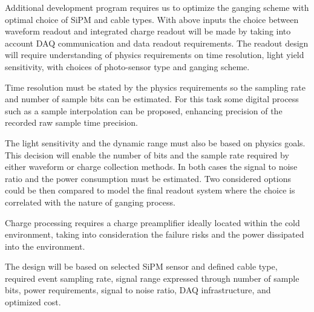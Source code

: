Additional development program requires us to optimize the ganging scheme with optimal choice of SiPM and cable types. With above inputs 
the choice between waveform readout and integrated charge readout will be made by taking into account DAQ communication and data 
readout requirements. The readout design will require understanding of physics requirements on time resolution, light yield 
sensitivity, with choices of photo-sensor type and ganging scheme. 

Time resolution must be stated by the physics requirements so the sampling rate and number of sample bits can be estimated. For this task 
some digital process such as a sample interpolation can be proposed, enhancing precision of the recorded raw sample time precision.

The light sensitivity and the dynamic range must also be based on physics goals. This decision will enable the number of bits and the sample 
rate required by either waveform or charge collection methods. In both cases the signal to noise ratio and the power consumption must be estimated. 
Two considered options could be then compared to model the final readout system where the choice is  correlated with the nature of ganging process. 


Charge processing requires a charge preamplifier ideally located within the cold environment, taking into consideration the failure risks and the power 
dissipated into the environment.

The design will be based on selected SiPM sensor and defined cable type, required event sampling rate, signal range expressed 
through number of sample bits, power requirements, signal to noise ratio, DAQ infrastructure, and optimized cost.



